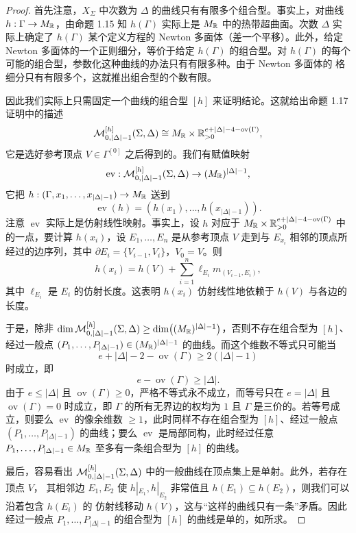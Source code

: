 \begin{proof}
首先注意，$X_\Sigma$ 中次数为 $\Delta$ 的曲线只有有限多个组合型。事实上，对曲线
$h : \Gamma \to M_{\mathbb{R}}$，由命题 1.15 知 $h(\Gamma)$ 实际上是 $M_{\mathbb{R}}$ 中的热带超曲面。次数 $\Delta$ 实际上确定了
$h(\Gamma)$ 某个定义方程的 Newton 多面体（差一个平移）。此外，给定 Newton 多面体的一个正则细分，等价于给定
$h(\Gamma)$ 的组合型。对 $h(\Gamma)$ 的每个可能的组合型，参数化这种曲线的办法只有有限多种。由于 Newton 多面体的
格细分只有有限多个，这就推出组合型的个数有限。

因此我们实际上只需固定一个曲线的组合型 $[h]$ 来证明结论。这就给出命题 1.17 证明中的描述
\[
\mathcal{M}^{[h]}_{0,|\Delta|-1}(\Sigma,\Delta) \cong M_{\mathbb{R}} \times \mathbb{R}^{e+|\Delta|-4-\operatorname{ov}(\Gamma)}_{>0},
\]
它是选好参考顶点 $V \in \Gamma^{[0]}$ 之后得到的。我们有赋值映射
\[
\operatorname{ev} : \mathcal{M}^{[h]}_{0,|\Delta|-1}(\Sigma,\Delta) \to (M_{\mathbb{R}})^{|\Delta|-1},
\]
它把 $h : (\Gamma,x_1,\dots,x_{|\Delta|-1}) \to M_{\mathbb{R}}$ 送到
\[
\operatorname{ev}(h) = (h(x_1),\dots,h(x_{|\Delta|-1})).
\]
注意 $\operatorname{ev}$ 实际上是仿射线性映射。事实上，设 $h$ 对应于
$M_{\mathbb{R}} \times \mathbb{R}^{e+|\Delta|-4-\operatorname{ov}(\Gamma)}_{>0}$ 中的一点，要计算 $h(x_i)$，设 $E_1,\dots,E_n$ 是从参考顶点
$V$ 走到与 $E_{x_i}$ 相邻的顶点所经过的边序列，其中 $\partial E_i = \{V_{i-1},V_i\}$，$V_0 = V$。则
\[
h(x_i) = h(V) + \sum_{i=1}^n \ell_{E_i} m_{(V_{i-1},E_i)},
\]
其中 $\ell_{E_i}$ 是 $E_i$ 的仿射长度。这表明 $h(x_i)$ 仿射线性地依赖于 $h(V)$ 与各边的长度。

于是，除非 $\dim \mathcal{M}^{[h]}_{0,|\Delta|-1}(\Sigma,\Delta) \ge \dim\bigl((M_{\mathbb{R}})^{|\Delta|-1}\bigr)$，否则不存在组合型为
$[h]$、经过一般点 $(P_1,\dots,P_{|\Delta|-1}) \in (M_{\mathbb{R}})^{|\Delta|-1}$ 的曲线。而这个维数不等式只可能当
\[
e + |\Delta| - 2 - \operatorname{ov}(\Gamma) \ge 2(|\Delta|-1)
\]
时成立，即
\[
e - \operatorname{ov}(\Gamma) \ge |\Delta|.
\]
由于 $e \le |\Delta|$ 且 $\operatorname{ov}(\Gamma) \ge 0$，严格不等式永不成立，而等号只在 $e = |\Delta|$ 且
$\operatorname{ov}(\Gamma) = 0$ 时成立，即 $\Gamma$ 的所有无界边的权均为 $1$ 且 $\Gamma$ 是三价的。若等号成立，则要么
$\operatorname{ev}$ 的像余维数 $\ge 1$，此时同样不存在组合型为 $[h]$、经过一般点
$(P_1,\dots,P_{|\Delta|-1})$ 的曲线；要么 $\operatorname{ev}$ 是局部同构，此时经过任意
$P_1,\dots,P_{|\Delta|-1} \in M_{\mathbb{R}}$ 至多有一条组合型为 $[h]$ 的曲线。

最后，容易看出 $\mathcal{M}^{[h]}_{0,|\Delta|-1}(\Sigma,\Delta)$ 中的一般曲线在顶点集上是单射。此外，若存在顶点 $V$，
其相邻边 $E_1, E_2$ 使 $h|_{E_1}, h|_{E_2}$ 非常值且 $h(E_1) \subseteq h(E_2)$，则我们可以沿着包含 $h(E_i)$ 的
仿射线移动 $h(V)$，这与“这样的曲线只有一条”矛盾。因此经过一般点 $P_1,\dots,P_{|\Delta|-1}$ 的组合型为 $[h]$
的曲线是单的，如所求。
\end{proof}

